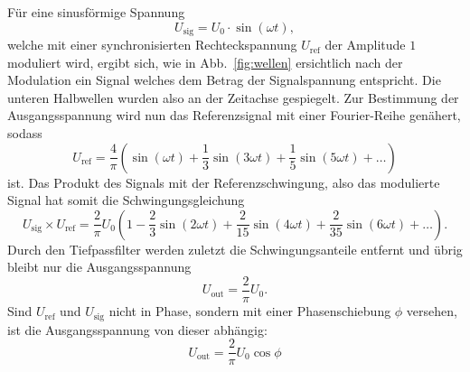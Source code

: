 Für eine sinusförmige Spannung
\begin{equation}
  U_\mathrm{sig} = U_0 \cdot \sin (\omega t),
\end{equation}
welche mit einer synchronisierten Rechteckspannung $U_\mathrm{ref}$ der Amplitude $1$ moduliert wird, ergibt sich, wie in Abb.~\ref{fig:wellen} ersichtlich nach der Modulation ein Signal welches dem Betrag der Signalspannung entspricht. Die unteren Halbwellen wurden also an der Zeitachse gespiegelt.
Zur Bestimmung der Ausgangsspannung wird nun das Referenzsignal mit einer Fourier-Reihe genähert, sodass
\begin{equation}
  U_\mathrm{ref} = \frac{4}{\pi} \left( \sin(\omega t) + \frac{1}{3} \sin(3\omega t) + \frac{1}{5} \sin(5\omega t) + … \right)
\end{equation}
ist. Das Produkt des Signals mit der Referenzschwingung, also das modulierte Signal hat somit die Schwingungsgleichung
\begin{equation}
  U_\mathrm{sig} \times U_\mathrm{ref} = \frac{2}{\pi} U_0 \left( 1 - \frac{2}{3} \sin(2 \omega t) + \frac{2}{15} \sin(4\omega t) + \frac{2}{35} \sin(6\omega t) + … \right).
\end{equation}
Durch den Tiefpassfilter werden zuletzt die Schwingungsanteile entfernt und übrig bleibt nur die Ausgangsspannung
\begin{equation}
  U_\mathrm{out} = \frac{2}{\pi} U_0.
\end{equation}
Sind $U_\mathrm{ref}$ und $U_\mathrm{sig}$ nicht in Phase, sondern mit einer Phasenschiebung $\phi$ versehen, ist die Ausgangsspannung von dieser abhängig:
\begin{equation}
  U_\mathrm{out} = \frac{2}{\pi} U_0 \cos \phi
\end{equation}

